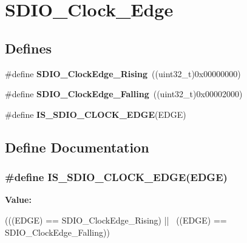 \hypertarget{group__SDIO__Clock__Edge}{
\section{SDIO\_\-Clock\_\-Edge}
\label{group__SDIO__Clock__Edge}
}
\subsection*{Defines}
\begin{DoxyCompactItemize}
\item 
\hypertarget{group__SDIO__Clock__Edge_ga6d0f902037762a3048d95303c0037313}{
\#define {\bfseries SDIO\_\-ClockEdge\_\-Rising}~((uint32\_\-t)0x00000000)}
\label{group__SDIO__Clock__Edge_ga6d0f902037762a3048d95303c0037313}

\item 
\hypertarget{group__SDIO__Clock__Edge_ga7be68024e3e2fe1994def85bc944189b}{
\#define {\bfseries SDIO\_\-ClockEdge\_\-Falling}~((uint32\_\-t)0x00002000)}
\label{group__SDIO__Clock__Edge_ga7be68024e3e2fe1994def85bc944189b}

\item 
\#define {\bfseries IS\_\-SDIO\_\-CLOCK\_\-EDGE}(EDGE)
\end{DoxyCompactItemize}


\subsection{Define Documentation}
\hypertarget{group__SDIO__Clock__Edge_ga63420b10a52e3d82a89a45f20dc41786}{
\subsubsection[{IS\_\-SDIO\_\-CLOCK\_\-EDGE}]{\setlength{\rightskip}{0pt plus 5cm}\#define IS\_\-SDIO\_\-CLOCK\_\-EDGE(EDGE)}}
\label{group__SDIO__Clock__Edge_ga63420b10a52e3d82a89a45f20dc41786}
{\bfseries Value:}
\begin{DoxyCode}
(((EDGE) == SDIO_ClockEdge_Rising) || \
                                  ((EDGE) == SDIO_ClockEdge_Falling))
\end{DoxyCode}
